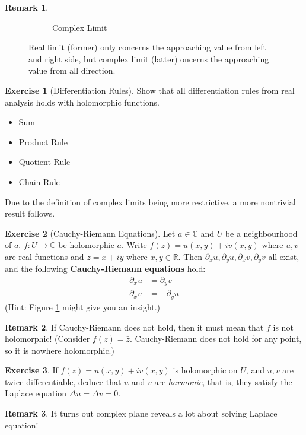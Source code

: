 \documentclass[a4paper, 12pt]{article}
\theoremstyle{definition}
\newtheorem{exercise}{Exercise}
\newtheorem{remark}{Remark}
\numberwithin{definition}{section}
\numberwithin{exercise}{section}
\numberwithin{remark}{section}
\numberwithin{figure}{section}
\newcommand{\R}{\mathbb{R}}
\newcommand{\C}{\mathbb{C}}
\begin{document}
\begin{remark}
\begin{figure}[tbp]
\begin{subfigure}[b]{0.5\textwidth}
            \caption{Complex Limit}
        \end{subfigure}
        \caption{Real limit (former) only concerns the approaching value from left and right side, but complex limit (latter) oncerns the approaching value from all direction.}
        \label{fig: Real and Complex Limit}
    \end{figure}
\end{remark}
\begin{exercise}[Differentiation Rules]
    Show that all differentiation rules from real analysis holds
    with holomorphic functions.
    \begin{itemize}
        \item Sum
        \item Product Rule
        \item Quotient Rule
        \item Chain Rule
    \end{itemize}
\end{exercise}
Due to the definition of complex limits being more restrictive,
a more nontrivial result follows.
\begin{exercise}[Cauchy-Riemann Equations]
    Let $a \in \C$ and $U$ be a neighbourhood of $a$.
    $f : U \rightarrow \C$ be holomorphic $a$.
    Write $f(z) = u(x,y) + i v(x,y)$ where $u,v$ are real functions
    and $z = x + iy$ where $x,y \in \R$.
    Then $\partial_x u, \partial_y u, \partial_x v, \partial_y v$ all exist,
    and the following \textbf{Cauchy-Riemann equations} hold:
    \begin{align*}
        \partial_x u &= \partial_y v \\
        \partial_x v &= - \partial_y u
    \end{align*}
(Hint: Figure \ref{fig: Real and Complex Limit} might give you an insight.)
\end{exercise}
\begin{remark}
    If Cauchy-Riemann does not hold, then it must mean that $f$ is not holomorphic! (Consider $f(z) = \bar{z}$. Cauchy-Riemann does not hold for any point, so it is nowhere holomorphic.)
\end{remark}
\begin{exercise}
    If $f(z) = u(x,y) + i v(x,y)$ is holomorphic on $U$,
    and $u,v$ are twice differentiable,
    deduce that $u$ and $v$ are \textit{harmonic}, that is,
    they satisfy the Laplace equation $\Delta u = \Delta v = 0$.
\end{exercise}
\begin{remark}
    It turns out complex plane reveals a lot about solving Laplace equation!
\end{remark}
\end{document}
